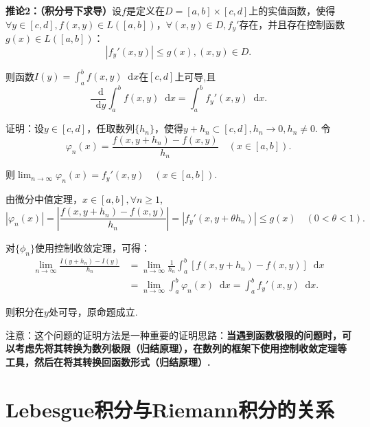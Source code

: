 \documentclass[bwprint, withoutpreface]{cumcmthesis}
\newcommand*{\dif}{\mathop{}\!\mathrm{d}}
\begin{document}
\textbf{推论2：（积分号下求导）}设$f$是定义在$D = [a, b] \times [c, d]$上的实值函数，使得$\forall y \in [c, d], f(x, y) \in L([a, b])$，$\forall (x, y) \in D, {f_y}'$存在，并且存在控制函数$g(x) \in L([a, b])$：
\begin{equation*}
	|{f_y}'(x, y)| \leqslant g(x), (x, y) \in D.
\end{equation*}

则函数$I(y) = \int_{a}^{b} f(x, y) \dif x$在$[c, d]$上可导,且
\begin{equation}
	\frac{\dif}{\dif y} \int_{a}^{b} f(x, y) \dif x = \int_{a}^{b} {f_y}' (x, y) \dif x.
\end{equation}

证明：设$y \in [c, d]$，任取数列$\{h_n\}$，使得$y + h_n \subset [c, d], h_n \to 0, h_n \neq 0$. 令
\begin{equation*}
	\varphi_n(x) = \frac{f(x, y + h_n) - f(x, y)}{h_n} \quad (x \in [a, b]).
\end{equation*}

则$\lim_{n \to \infty} \varphi_n(x) = {f_y}'(x, y) \quad (x \in [a, b])$.

由微分中值定理，$x \in [a, b], \forall n \geqslant 1$, 
\begin{equation*}
	|\varphi_n(x)| = |\frac{f(x, y + h_n) - f(x, y)}{h_n}| = |{f_y}'(x, y + \theta h_n)| \leqslant g(x) \quad (0 < \theta < 1).
\end{equation*}

对$\{\phi_n\}$使用控制收敛定理，可得：
\begin{align*}
	\lim_{n \to \infty}{\frac{I(y + h_n) - I(y)}{h_n}} & = \lim_{n \to \infty} \frac{1}{h_n}{\int_{a}^{b}{[f(x, y + h_n) - f(x, y)] \dif x}} \\
													   & = \lim_{n \to \infty} {\int_{a}^{b} \varphi_n(x) \dif x} = \int_{a}^{b}{f_y}'(x, y) \dif x.
\end{align*}

则积分在$y$处可导，原命题成立.

注意：这个问题的证明方法是一种重要的证明思路：\textbf{当遇到函数极限的问题时，可以考虑先将其转换为数列极限（归结原理），在数列的框架下使用控制收敛定理等工具，然后在将其转换回函数形式（归结原理）.}

\section{Lebesgue积分与Riemann积分的关系}
\end{document}
